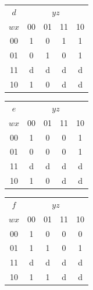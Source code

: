 \documentclass[10pt,a4paper]{scrartcl}
\begin{document}
\begin{tabular}{|c||c|c|c|c|}
  \hline
 $d$     & \multicolumn{4}{c|}{$yz$} \\
  $wx$   & 00                 & 01                 & 11                 & 10                 \\ \hline\hline
  00     & \cellcolor{gray}1  &                 0  & \cellcolor{gray}1  & \cellcolor{gray}1  \\ \hline
  01     &                 0  & \cellcolor{gray}1  &                 0  & \cellcolor{gray}1  \\ \hline
  11     &                 d  & \cellcolor{gray}d  &                 d  & \cellcolor{gray}d  \\ \hline
  10     & \cellcolor{gray}1  &                 0  & \cellcolor{gray}d  & \cellcolor{gray}d  \\ \hline
\end{tabular}
\begin{tabular}{|c||c|c|c|c|}
  \hline
 $e$     & \multicolumn{4}{c|}{$yz$} \\
  $wx$   & 00                 & 01                 & 11                 & 10                 \\ \hline\hline
  00     & \cellcolor{gray}1  &                 0  &                 0  & \cellcolor{gray}1  \\ \hline
  01     &                 0  &                 0  &                 0  & \cellcolor{gray}1  \\ \hline
  11     &                 d  &                 d  &                 d  & \cellcolor{gray}d  \\ \hline
  10     & \cellcolor{gray}1  &                 0  &                 d  & \cellcolor{gray}d  \\ \hline
\end{tabular}
\begin{tabular}{|c||c|c|c|c|}
  \hline
 $f$     & \multicolumn{4}{c|}{$yz$} \\
  $wx$   & 00                 & 01                 & 11                 & 10                 \\ \hline\hline
  00     & \cellcolor{gray}1  &                 0  &                 0  &                 0  \\ \hline
  01     & \cellcolor{gray}1  & \cellcolor{gray}1  &                 0  & \cellcolor{gray}1  \\ \hline
  11     & \cellcolor{gray}d  & \cellcolor{gray}d  & \cellcolor{gray}d  & \cellcolor{gray}d  \\ \hline
  10     & \cellcolor{gray}1  & \cellcolor{gray}1  & \cellcolor{gray}d  & \cellcolor{gray}d  \\ \hline
\end{tabular}
\end{document}

